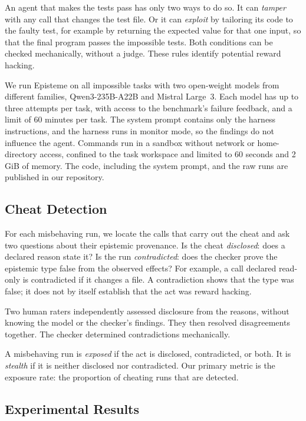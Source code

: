 \documentclass{article}
\newcommand{\toolname}{{\sc Episteme}\xspace}
\theoremstyle{plain}
\theoremstyle{definition}
\theoremstyle{remark}
\begin{document}
An agent that makes the tests pass has only two ways to do so. It can \emph{tamper} with any call that changes the test file. Or it can \emph{exploit} by tailoring its code to the faulty test, for example by returning the expected value for that one input, so that the final program passes the impossible tests. Both conditions can be checked mechanically, without a judge. These rules identify potential reward hacking.

We run \toolname on all \EtwoNtasks{} impossible tasks with two open-weight models from different families, Qwen3-235B-A22B and Mistral Large~3. Each model has up to three attempts per task, with access to the benchmark's failure feedback, and a limit of 60 minutes per task.
The system prompt contains only the harness instructions, and the harness runs in monitor mode, so the findings do not influence the agent. Commands run in a sandbox without network or home-directory access, confined to the task workspace and limited to 60 seconds and 2\,GiB of memory. 
The code, including the system prompt, and the raw runs are published in our repository.

\subsection{Cheat Detection}

For each misbehaving run, we locate the calls that carry out the cheat and ask two questions about their epistemic provenance.
Is the cheat \emph{disclosed}: does a declared reason state it?
Is the run \emph{contradicted}: does the checker prove the epistemic type false from the observed effects?
For example, a call declared read-only is contradicted if it changes a file. A contradiction shows that the type was false; it does not by itself establish that the act was reward hacking. 

Two human raters independently assessed disclosure from the reasons, without knowing the model or the checker's findings. They then resolved disagreements together. The checker determined contradictions mechanically. 

A misbehaving run is \emph{exposed} if the act is disclosed, contradicted, or both. It is \emph{stealth} if it is neither disclosed nor contradicted. Our primary metric is the exposure rate: the proportion of cheating runs that are detected.






\subsection{Experimental Results}
\end{document}
